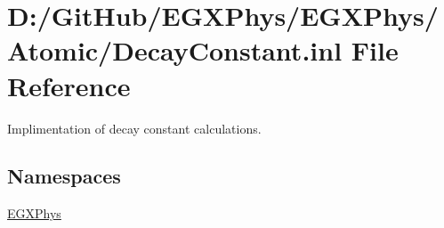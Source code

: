 \hypertarget{_decay_constant_8inl}{}\section{D\+:/\+Git\+Hub/\+E\+G\+X\+Phys/\+E\+G\+X\+Phys/\+Atomic/\+Decay\+Constant.inl File Reference}
\label{_decay_constant_8inl}


Implimentation of decay constant calculations.  


\subsection*{Namespaces}
\begin{DoxyCompactItemize}
\item 
 \mbox{\hyperlink{namespace_e_g_x_phys}{E\+G\+X\+Phys}}
\end{DoxyCompactItemize}
